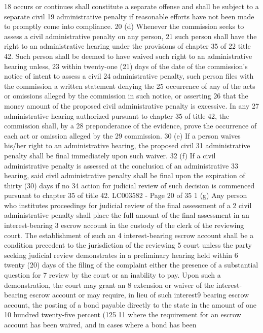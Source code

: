 18 occurs or continues shall constitute a separate offense and shall be subject to a separate civil
19 administrative penalty if reasonable efforts have not been made to promptly come into compliance.
20 (d) Whenever the commission seeks to assess a civil administrative penalty on any person,
21 such person shall have the right to an administrative hearing under the provisions of chapter 35 of
22 title 42. Such person shall be deemed to have waived such right to an administrative hearing unless,
23 within twenty-one (21) days of the date of the commission's notice of intent to assess a civil
24 administrative penalty, such person files with the commission a written statement denying the
25 occurrence of any of the acts or omissions alleged by the commission in such notice, or asserting
26 that the money amount of the proposed civil administrative penalty is excessive. In any
27 administrative hearing authorized pursuant to chapter 35 of title 42, the commission shall, by a
28 preponderance of the evidence, prove the occurrence of each act or omission alleged by the
29 commission.
30 (e) If a person waives his/her right to an administrative hearing, the proposed civil
31 administrative penalty shall be final immediately upon such waiver.
32 (f) If a civil administrative penalty is assessed at the conclusion of an administrative
33 hearing, said civil administrative penalty shall be final upon the expiration of thirty (30) days if no
34 action for judicial review of such decision is commenced pursuant to chapter 35 of title 42.
LC003582 - Page 20 of 35
1 (g) Any person who institutes proceedings for judicial review of the final assessment of a
2 civil administrative penalty shall place the full amount of the final assessment in an interest-bearing
3 escrow account in the custody of the clerk of the reviewing court. The establishment of such an
4 interest-bearing escrow account shall be a condition precedent to the jurisdiction of the reviewing
5 court unless the party seeking judicial review demonstrates in a preliminary hearing held within
6 twenty (20) days of the filing of the complaint either the presence of a substantial question for
7 review by the court or an inability to pay. Upon such a demonstration, the court may grant an
8 extension or waiver of the interest-bearing escrow account or may require, in lieu of such interest9 bearing escrow account, the posting of a bond payable directly to the state in the amount of one
10 hundred twenty-five percent (125%
11 where the requirement for an escrow account has been waived, and in cases where a bond has been
